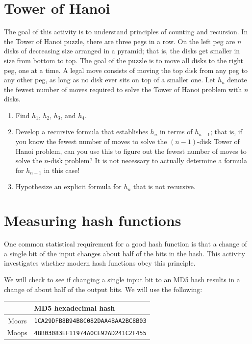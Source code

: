 \documentclass{book}
\theoremstyle{plain}
\theoremstyle{definition}
\newif\ifprintsolutions
\newcommand{\solution}[1]{\ifprintsolutions \begin{sloppypar}{\it #1}\end{sloppypar} \fi} %
\begin{document}
\section{Tower of Hanoi}
The goal of this activity is to understand principles of counting and recursion. In the Tower of Hanoi puzzle, there are three pegs in a row. On the left peg are $n$ disks of decreasing size arranged in a pyramid; that is, the disks get smaller in size from bottom to top. The goal of the puzzle is to move all disks to the right peg, one at a time. A legal move consists of moving the top disk from any peg to any other peg, as long as no disk ever sits on top of a smaller one. Let $h_n$ denote the fewest number of moves required to solve the Tower of Hanoi problem with $n$ disks.
\begin{enumerate}
\item Find $h_1$, $h_2$, $h_3$, and $h_4$. \solution{The numbers are $h_1 = 1$, $h_2 = 3$, $h_3 = 7$, and $h_4 = 15$.}
\item Develop a recursive formula that establishes $h_n$ in terms of $h_{n-1}$; that is, if you know the fewest number of moves to solve the $(n-1)$-disk Tower of Hanoi problem, can you use this to figure out the fewest number of moves to solve the $n$-disk problem? It is not necessary to actually determine a formula for $h_{n-1}$ in this case! \solution{We have $h_n = 2h_{n-1} + 1$ since we first move the top $n-1$ disks to the middle peg in $h_{n-1}$ moves, then move the bottom disk to the right peg in one move, and then move the top $n-1$ disks to the right peg in $h_{n-1}$ moves.}
\item Hypothesize an explicit formula for $h_n$ that is not recursive. \solution{The formula is $h_n = 2^n - 1$.}
\end{enumerate}

\section{Measuring hash functions}
One common statistical requirement for a good hash function is that a change of a single bit of the input changes about half of the bits in the hash. This activity investigates whether modern hash functions obey this principle.

We will check to see if changing a single input bit to an MD5 hash results in a change of about half of the output bits. We will use the following:

\begin{center}
\begin{tabular}{cl}
& MD5 hexadecimal hash \\
\hline
Moors & \texttt{1CA29DFB8B94B8C082DAA4BAA2BC8B03} \\
Moops & \texttt{4BB03083EF11974A0CE92AD241C2F455}
\end{tabular}
\end{center}
\end{document}
